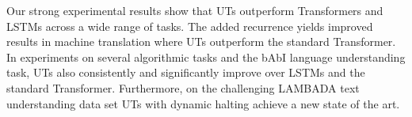 Our strong experimental results show that UTs outperform Transformers and LSTMs across a wide range of tasks. The added recurrence yields improved results in machine translation where UTs outperform the standard Transformer. In experiments on several algorithmic tasks and the bAbI language understanding task, UTs also consistently and significantly improve over LSTMs and the standard Transformer. Furthermore, on the challenging LAMBADA text understanding data set UTs with dynamic halting achieve a new state of the art.



